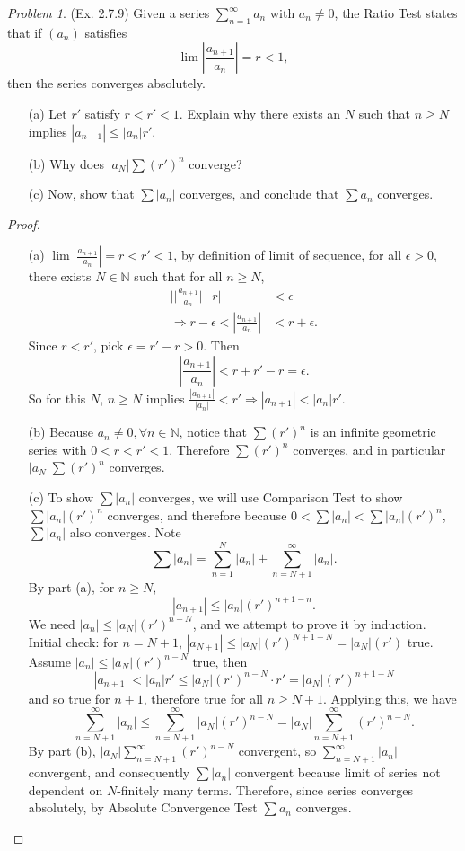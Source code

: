 \documentclass[11pt,twoside, reqno]{amsart}
\theoremstyle{remark}
\newtheorem{Prob}{Problem}
\def\N{\mathbb N}
\renewcommand{\implies}{\Rightarrow}
\begin{document}
\begin{Prob}(Ex. 2.7.9) Given a series $\sum^\infty_{n=1}a_n$ with $a_n \neq 0$, the Ratio Test states that if $(a_n)$ satisfies
$$
    \lim |\frac{a_{n+1}}{a_n}| = r < 1,
$$
then the series converges absolutely.
\begin{enumerate}
    \item [(a)] Let $r'$ satisfy $r < r' <1$. Explain why there exists an $N$ such that $n \geq N$ implies $|a_{n+1}| \leq |a_n|r'$.
    \item [(b)] Why does $|a_N|\sum (r')^n$ converge?
    \item [(c)] Now, show that $\sum |a_n|$ converges, and conclude that $\sum a_n$ converges.
\end{enumerate}
\end{Prob}

\begin{proof}
\begin{enumerate}
    \item [(a)] $\lim |\frac{a_{n+1}}{a_n}| = r < r' < 1$, by definition of limit of sequence, for all $\epsilon > 0$, there exists $N \in \N$ such that for all $n \geq N$,
    \begin{align*}
        ||\frac{a_{n+1}}{a_n}| - r| &< \epsilon \\
        \implies r - \epsilon < |\frac{a_{n+1}}{a_n}| &< r+ \epsilon.
    \end{align*}
    Since $r < r'$, pick $\epsilon = r' - r > 0$. Then
    $$
        |\frac{a_{n+1}}{a_n}| < r + r' - r = \epsilon.
    $$
    So for this $N$, $n \geq N$ implies $\frac{|a_{n+1}|}{|a_n|} < r' \implies |a_{n+1}| < |a_n|r'$.
    \item [(b)] Because $a_n \neq 0, \forall n \in \N$, notice that $\sum (r')^n$ is an infinite geometric series with $0 < r < r' < 1$. Therefore $\sum (r')^n$ converges, and in particular $|a_N|\sum(r')^n$ converges.
    \item [(c)] To show $\sum |a_n|$ converges, we will use Comparison Test to show $\sum |a_n| (r')^n$ converges, and therefore because $0 < \sum |a_n| < \sum |a_n| (r')^n$, $\sum |a_n|$ also converges. Note
    $$
        \sum |a_n| = \sum_{n=1}^N |a_n| + \sum_{n = N+1}^\infty |a_n|.
    $$
    By part (a), for $n \geq N$,
    $$
        |a_{n+1}| \leq |a_n|(r')^{n+1-n}.
    $$
    We need $|a_n| \leq |a_N|(r')^{n-N}$, and we attempt to prove it by induction. Initial check: for $n = N+1$, $|a_{N+1}| \leq |a_N|(r')^{N+1-N} = |a_N|(r')$ true. Assume $|a_n| \leq |a_{N}|(r')^{n-N}$ true, then
    $$
        |a_{n+1}| < |a_n|r' \leq |a_{N}|(r')^{n-N}\cdot r' = |a_N|(r')^{n+1 - N}
    $$
    and so true for $n+1$, therefore true for all $n \geq N+1$.
    Applying this, we have
    $$
        \sum_{n=N+1}^\infty |a_n| \leq \sum_{n=N+1}^\infty |a_N|(r')^{n-N} = |a_N|\sum_{n=N+1}^\infty (r')^{n-N}.
    $$
    By part (b), $|a_N| \sum^\infty_{n=N+1} (r')^{n-N}$ convergent, so $\sum^\infty_{n=N+1} |a_n|$ convergent, and consequently $\sum |a_n|$ convergent because limit of series not dependent on $N$-finitely many terms. Therefore, since series converges absolutely, by Absolute Convergence Test $\sum a_n$ converges.
\end{enumerate}


\end{proof}
\end{document}
